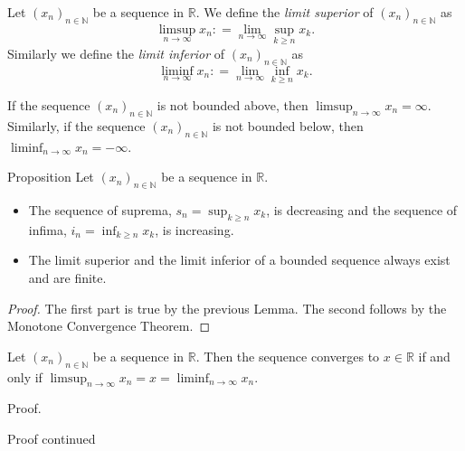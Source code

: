 \documentclass [aspectratio=169]{beamer}
\newcommand{\R}{{\mathbb{R}}}
\newcommand{\N}{{\mathbb{N}}}
\begin{document}
\begin{frame}
\begin{definition}
Let $(x_n)_{n\in \N}$ be a sequence in $\R$. We define the \emph{limit superior} of $(x_n)_{n\in \N}$ as 
$$\limsup_{n\to \infty} x_n: = \lim_{n\to \infty} \sup_{k\geq n} x_k.$$ 
Similarly we define  the \emph{limit inferior} of $(x_n)_{n\in \N}$ as 
$$\liminf_{n\to \infty} x_n: = \lim_{n\to \infty} \inf_{k\geq n} x_k.$$
\end{definition}
\vspace{1em}
If the sequence $(x_n)_{n\in \N}$ is not bounded above, then $\limsup_{n\to \infty} x_n = \infty$. Similarly, if the sequence $(x_n)_{n\in \N}$ is not bounded below, then $\liminf_{n\to \infty} x_n = -\infty$. 
\end{frame}

\begin{frame}
\begin{exampleblock}{Proposition}
Let $(x_n)_{n \in \N}$ be a sequence in $\R$.
\begin{itemize} 
\item The sequence of suprema, $s_n = \sup_{k\geq n} x_k$, is decreasing and the sequence of infima, $i_n = \inf_{k\geq n} x_k$, is increasing.
\item The limit superior and the limit inferior of a bounded sequence always exist and are finite.
\end{itemize}
\end{exampleblock}
\begin{proof}
The first part is true by the previous Lemma. The second follows by the Monotone Convergence Theorem.
\end{proof}

\end{frame}

\begin{frame}
\begin{theorem}
Let $(x_n)_{n\in \N}$ be a sequence in $\R$. Then the sequence converges to $x\in \R$ if and only if $\limsup_{n\to \infty} x_n= x =\liminf_{n\to \infty} x_n$.
\end{theorem}
\begin{block}{Proof.}
\vspace{4.5cm}
\end{block}
\end{frame}


\begin{frame}
\begin{block}{Proof continued}
\vspace{6.5cm}
\end{block}
\end{frame}
\end{document}
